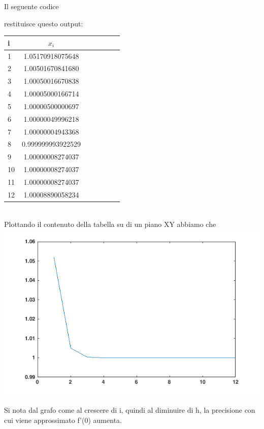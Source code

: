 Il seguente codice


restituisce questo output:

\begin{tabular}{l*{6}{c}}
i & \( x_i \)  \\
\hline
1 & 1.05170918075648  \\
2 & 1.00501670841680  \\
3 & 1.00050016670838  \\
4 & 1.00005000166714  \\
5 & 1.00000500000697  \\
6 & 1.00000049996218   \\
7 & 1.00000004943368   \\
8 & 0.999999993922529  \\
9 & 1.00000008274037  \\
10 & 1.00000008274037  \\
11 & 1.00000008274037   \\
12 & 1.00008890058234  \\
\end{tabular} \\

Plottando il contenuto della tabella su di un piano XY abbiamo che \\
\includegraphics[scale=0.7]{cap_1/es4/es4.png}

Si nota dal grafo come al crescere di i, quindi al diminuire di h, la precisione con cui viene approssimato f'(0) aumenta.
